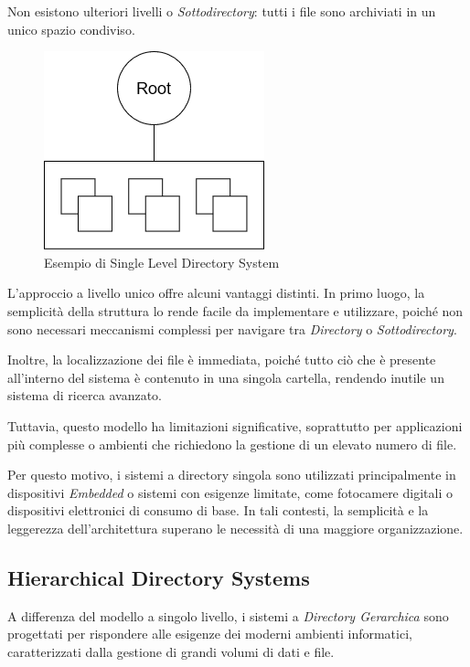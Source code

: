 \documentclass[12pt,a4paper,openright,twoside]{book}
\begin{document}
            Non esistono ulteriori livelli o \textit{Sottodirectory}: tutti i file sono archiviati in un unico spazio condiviso.

            \begin{figure} [h]
                \centering
                \includegraphics[width=.4\linewidth]{figures/SingleDirSystem.png}
                \caption{Esempio di Single Level Directory System}
                \label{fig:single-level-directory}
            \end{figure}

            L'approccio a livello unico offre alcuni vantaggi distinti. In primo luogo, la semplicità della struttura lo rende facile da implementare e utilizzare, poiché non sono necessari meccanismi complessi per navigare tra \textit{Directory} o \textit{Sottodirectory}.

            Inoltre, la localizzazione dei file è immediata, poiché tutto ciò che è presente all'interno del sistema è contenuto in una singola cartella, rendendo inutile un sistema di ricerca avanzato.

            Tuttavia, questo modello ha limitazioni significative, soprattutto per applicazioni più complesse o ambienti che richiedono la gestione di un elevato numero di file.

            Per questo motivo, i sistemi a directory singola sono utilizzati principalmente in dispositivi \textit{Embedded} o sistemi con esigenze limitate, come fotocamere digitali o dispositivi elettronici di consumo di base. In tali contesti, la semplicità e la leggerezza dell'architettura superano le necessità di una maggiore organizzazione.

        \subsection{Hierarchical Directory Systems}

            A differenza del modello a singolo livello, i sistemi a \textit{Directory Gerarchica} sono progettati per rispondere alle esigenze dei moderni ambienti informatici, caratterizzati dalla gestione di grandi volumi di dati e file.
\end{document}
